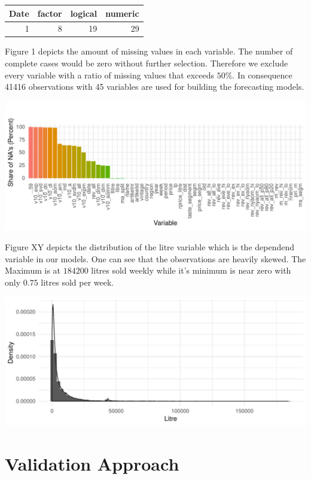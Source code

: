 \documentclass[11pt,]{article}
\begin{document}
\begin{longtable}[]{@{}rrrr@{}}
\toprule
Date & factor & logical & numeric\tabularnewline
\midrule
\endhead
1 & 8 & 19 & 29\tabularnewline
\bottomrule
\end{longtable}

Figure 1 depicts the amount of missing values in each variable. The
number of complete cases would be zero without further selection.
Therefore we exclude every variable with a ratio of missing values that
exceeds \(50\%\). In consequence 41416 observations with 45 variables
are used for building the forecasting models.

\includegraphics{../00_data/output_paper/02_missings_alt.pdf}

Figure XY depicts the distribution of the litre variable which is the
dependend variable in our models. One can see that the observations are
heavily skewed. The Maximum is at \(184200\) litres sold weekly while
it's minimum is near zero with only \(0.75\) litres sold per week.

\includegraphics{../00_data/output_paper/04_hist_litre.pdf}

\hypertarget{validation-approach}{%
\section{Validation Approach}\label{validation-approach}}
\end{document}
